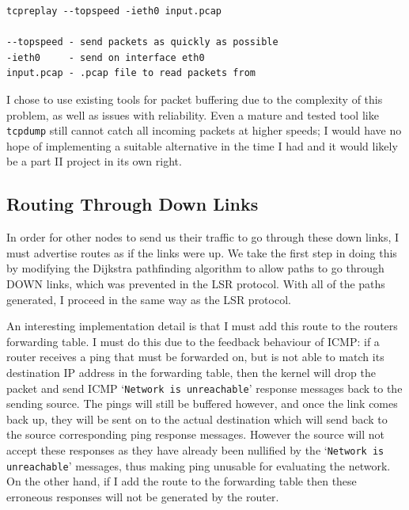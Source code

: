 \documentclass[withindex,glossary,openany]{cam-thesis}
\begin{document}

\begin{lstlisting}[label=replay_command, caption=\texttt{tcpreplay} command with explanation of arguments, frame=tb]
tcpreplay --topspeed -ieth0 input.pcap

--topspeed - send packets as quickly as possible
-ieth0     - send on interface eth0
input.pcap - .pcap file to read packets from
\end{lstlisting}

I chose to use existing tools for packet buffering due to the complexity of this problem, as well as issues with reliability. Even a mature and tested tool like \texttt{tcpdump} still cannot catch all incoming packets at higher speeds; I would have no hope of implementing a suitable alternative in the time I had and it would likely be a part II project in its own right.

\subsection{Routing Through Down Links}
\label{subsec:routing_down_links}

In order for other nodes to send us their traffic to go through these down links, I must advertise routes as if the links were up. We take the first step in doing this by modifying the Dijkstra pathfinding algorithm to allow paths to go through DOWN links, which was prevented in the LSR protocol. With all of the paths generated, I proceed in the same way as the LSR protocol.

An interesting implementation detail is that I must add this route to the routers forwarding table. I must do this due to the feedback behaviour of ICMP: if a router receives a ping that must be forwarded on, but is not able to match its destination IP address in the forwarding table, then the kernel will drop the packet and send ICMP `\texttt{Network is unreachable}' response messages back to the sending source. The pings will still be buffered however, and once the link comes back up, they will be sent on to the actual destination which will send back to the source corresponding ping response messages. However the source will not accept these responses as they have already been nullified by the `\texttt{Network is unreachable}' messages, thus making ping unusable for evaluating the network. On the other hand, if I add the route to the forwarding table then these erroneous responses will not be generated by the router.
\end{document}
